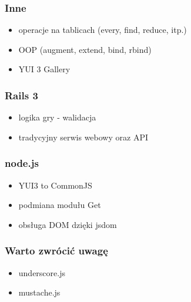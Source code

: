 \documentclass[16pt]{beamer}
\begin{document}
\begin{frame}
  \frametitle{Inne}
  \begin{itemize}
  \item operacje na tablicach (every, find, reduce, itp.)
  \item OOP (augment, extend, bind, rbind)
  \item YUI 3 Gallery
  \end{itemize}
\end{frame}

\begin{frame}
  \frametitle{Rails 3}
  \begin{itemize}
  \item logika gry - walidacja
  \item tradycyjny serwis webowy oraz API %
  \end{itemize}
\end{frame}

\begin{frame}
  \frametitle{node.js}
  \begin{itemize}
  \item YUI3 to CommonJS
  \item podmiana modułu Get
  \item obsługa DOM dzięki jsdom
  \end{itemize}
\end{frame}

\begin{frame}
  \frametitle{Warto zwrócić uwagę}
  \begin{itemize}
  \item underscore.js
  \item mustache.js
  \end{itemize}
\end{frame}

\end{document}
